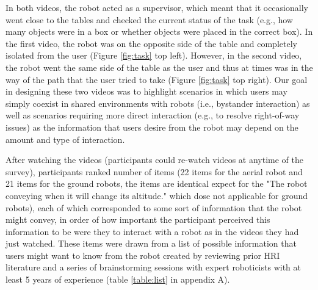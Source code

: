 \documentclass[letterpaper, 10 pt, conference]{ieeeconf}  %
\begin{document}
    In both videos, the robot acted as a supervisor, which meant that it occasionally went close to the tables and checked the current status of the task (e.g., how many objects were in a box or whether objects were placed in the correct box). In the first video, the robot was on the opposite side of the table and completely isolated from the user (Figure \ref{fig:task} top left). However, in the second video, the robot went the same side of the table as the user and thus at times was in the way of the path that the user tried to take (Figure \ref{fig:task} top right). Our goal in designing these two videos was to highlight scenarios in which users may simply coexist in shared environments with robots (i.e., bystander interaction) as well as scenarios requiring more direct interaction (e.g., to resolve right-of-way issues) as the information that users desire from the robot may depend on the amount and type of interaction. %
    

    
    After watching the videos (participants could re-watch videos at anytime of the survey), participants ranked number of items (22 items for the aerial robot and 21 items for the ground robots, the items are  identical expect for the "The robot conveying when it will change its altitude." which dose not applicable for ground robots), each of which corresponded to some sort of information that the robot might convey, in order of how important the participant perceived this information to be were they to interact with a robot as in the videos they had just watched. These items were drawn from a list of possible information that users might want to know from the robot created by reviewing prior HRI literature and a series of brainstorming sessions with expert roboticists with at least 5 years of experience (table \ref{table:list} in appendix A). 
    
\end{document}
